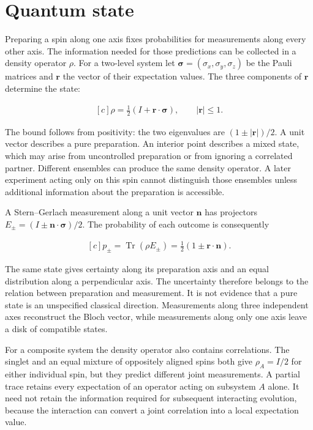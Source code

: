 \documentclass[11pt,oneside]{book}
\newenvironment{centeredalign}{\[\begin{gathered}[c]}{\end{gathered}\]}
\begin{document}
\clearpage

\section{Quantum state}

\label{topic:quantum-state}

Preparing a spin along one axis fixes probabilities for measurements along every other axis. The information needed for those predictions can be collected in a density operator \(\rho\). For a two-level system let \(\boldsymbol\sigma=(\sigma_x,\sigma_y,\sigma_z)\) be the Pauli matrices and \(\mathbf r\) the vector of their expectation values. The three components of \(\mathbf r\) determine the state:

\begin{centeredalign}
\rho=\frac12(I+\mathbf r\cdot\boldsymbol\sigma),\qquad |\mathbf r|\leq1.
\end{centeredalign}

The bound follows from positivity: the two eigenvalues are \((1\pm|\mathbf r|)/2\). A unit vector describes a pure preparation. An interior point describes a mixed state, which may arise from uncontrolled preparation or from ignoring a correlated partner. Different ensembles can produce the same density operator. A later experiment acting only on this spin cannot distinguish those ensembles unless additional information about the preparation is accessible.

A Stern--Gerlach measurement along a unit vector \(\mathbf n\) has projectors \(E_\pm=(I\pm\mathbf n\cdot\boldsymbol\sigma)/2\). The probability of each outcome is consequently

\begin{centeredalign}
p_\pm=\operatorname{Tr}(\rho E_\pm)=\frac12(1\pm\mathbf r\cdot\mathbf n).
\end{centeredalign}

The same state gives certainty along its preparation axis and an equal distribution along a perpendicular axis. The uncertainty therefore belongs to the relation between preparation and measurement. It is not evidence that a pure state is an unspecified classical direction. Measurements along three independent axes reconstruct the Bloch vector, while measurements along only one axis leave a disk of compatible states.

For a composite system the density operator also contains correlations. The singlet and an equal mixture of oppositely aligned spins both give \(\rho_A=I/2\) for either individual spin, but they predict different joint measurements. A partial trace retains every expectation of an operator acting on subsystem \(A\) alone. It need not retain the information required for subsequent interacting evolution, because the interaction can convert a joint correlation into a local expectation value.
\end{document}
